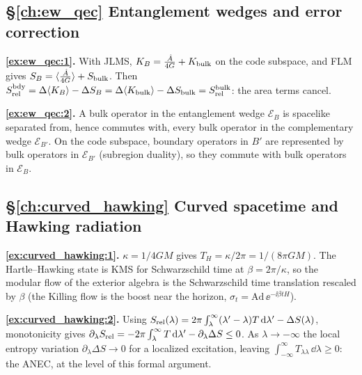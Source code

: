 {\subsection*{\S\ref{ch:ew_qec} Entanglement wedges and error correction}
\textbf{\ref{ex:ew_qec:1}.} With JLMS, $K_B=\frac{\hat A}{4G}+K_{\rm bulk}$ on the code subspace, and FLM gives $S_B=\langle\frac{\hat A}{4G}\rangle+S_{\rm bulk}$. Then $S_{\rm rel}^{\rm bdy}=\Delta\langle K_B\rangle-\Delta S_B=\Delta\langle K_{\rm bulk}\rangle-\Delta S_{\rm bulk}=S_{\rm rel}^{\rm bulk}$: the area terms cancel.\par
\textbf{\ref{ex:ew_qec:2}.} A bulk operator in the entanglement wedge $\mathcal E_B$ is spacelike separated from, hence commutes with, every bulk operator in the complementary wedge $\mathcal E_{B'}$. On the code subspace, boundary operators in $B'$ are represented by bulk operators in $\mathcal E_{B'}$ (subregion duality), so they commute with bulk operators in $\mathcal E_B$.\par

\subsection*{\S\ref{ch:curved_hawking} Curved spacetime and Hawking radiation}
\textbf{\ref{ex:curved_hawking:1}.} $\kappa=1/4GM$ gives $T_H=\kappa/2\pi=1/(8\pi GM)$. The Hartle--Hawking state is KMS for Schwarzschild time at $\beta=2\pi/\kappa$, so the modular flow of the exterior algebra is the Schwarzschild time translation rescaled by $\beta$ (the Killing flow is the boost near the horizon, $\sigma_t=\mathrm{Ad}\,\ee^{-\ii\beta tH}$).\par
\textbf{\ref{ex:curved_hawking:2}.} Using $S_{\rm rel}(\lambda)=2\pi\int_\lambda^\infty(\lambda'-\lambda)T\,\mathrm{d}\lambda'-\Delta S(\lambda)$, monotonicity gives $\partial_\lambda S_{\rm rel}=-2\pi\int_\lambda^\infty T\,\mathrm{d}\lambda'-\partial_\lambda\Delta S\le0$. As $\lambda\to-\infty$ the local entropy variation $\partial_\lambda\Delta S\to0$ for a localized excitation, leaving $\int_{-\infty}^\infty T_{\lambda\lambda}\,\dd\lambda\ge0$: the ANEC, at the level of this formal argument.\par

}
